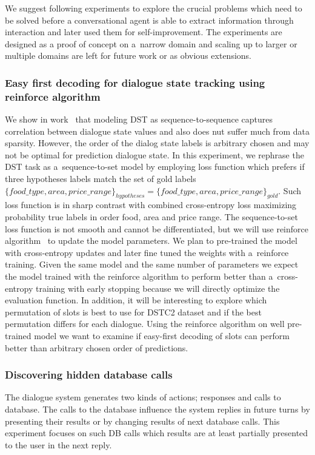 \documentclass[11pt]{article}
\begin{document}
We suggest following experiments to explore the crucial problems which need to be solved before a conversational agent is able to extract information through interaction and later used them for self-improvement.
The experiments are designed as a proof of concept on a~narrow domain and scaling up to larger or multiple domains are left for future work or as obvious extensions. 

\subsubsection*{Easy first decoding for dialogue state tracking using reinforce algorithm}
We show in work~\cite{platek_recurrent_2016} that modeling DST as sequence-to-sequence captures correlation between dialogue state values and also does nut suffer much from data sparsity.
However, the order of the dialog state labels is arbitrary chosen and may not be optimal for prediction dialogue state.
In this experiment, we rephrase the DST task as a~sequence-to-set model by employing loss function which prefers if three hypotheses labels match the set of gold labels $\{food\_type, area, price\_range\}_{hypotheses} = \{food\_type, area, price\_range\}_{gold}$.
Such loss function is in sharp contrast with combined cross-entropy loss maximizing probability true labels in order food, area and price range.
The sequence-to-set loss function is not smooth and cannot be differentiated, but we will use reinforce algorithm~\cite{williams_simple_1992} to update the model parameters.
We plan to pre-trained the model with cross-entropy updates and later fine tuned the weights with a~reinforce training.
Given the same model and the same number of parameters we expect the model trained with the reinforce algorithm to perform better than a~cross-entropy training with early stopping because we will directly optimize the evaluation function.
In addition, it will be interesting to explore which permutation of slots is best to use for DSTC2 dataset and if the best permutation differs for each dialogue.
Using the reinforce algorithm on well pre-trained model we want to examine if easy-first decoding of slots can perform better than arbitrary chosen order of predictions. 

\subsubsection*{Discovering hidden database calls}
The dialogue system generates two kinds of actions; responses and calls to database.
The calls to the database influence the system replies in future turns by presenting their results or by changing results of next database calls.
This experiment focuses on such DB calls which results are at least partially presented to the user in the next reply.
\end{document}
